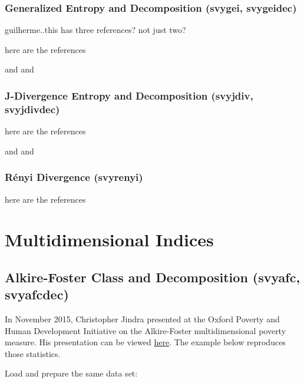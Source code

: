 \documentclass[]{book}
\begin{document}
\subsection{Generalized Entropy and Decomposition (svygei,
svygeidec)}\label{generalized-entropy-and-decomposition-svygei-svygeidec}

guilherme..this has three references? not just two?

here are the references

\citep{langel2012} and \citep{biewen2003} and \citep{shorrocks1984}

\subsection{J-Divergence Entropy and Decomposition (svyjdiv,
svyjdivdec)}\label{j-divergence-entropy-and-decomposition-svyjdiv-svyjdivdec}

here are the references

\citep{shorrocks1984} and \citep{rohde2016} and \citep{biewen2003}

\subsection{Rényi Divergence
(svyrenyi)}\label{renyi-divergence-svyrenyi}

here are the references

\citep{langel2012}

\chapter{Multidimensional Indices}\label{multidimensional}

\section{Alkire-Foster Class and Decomposition (svyafc,
svyafcdec)}\label{alkire-foster-class-and-decomposition-svyafc-svyafcdec}

In November 2015, Christopher Jindra presented at the Oxford Poverty and
Human Development Initiative on the Alkire-Foster multidimensional
poverty measure. His presentation can be viewed
\href{http://www.ophi.org.uk/wp-content/uploads/Jindra_151109_OPHISeminar.pdf}{here}.
The example below reproduces those statistics.

Load and prepare the same data set:
\end{document}
